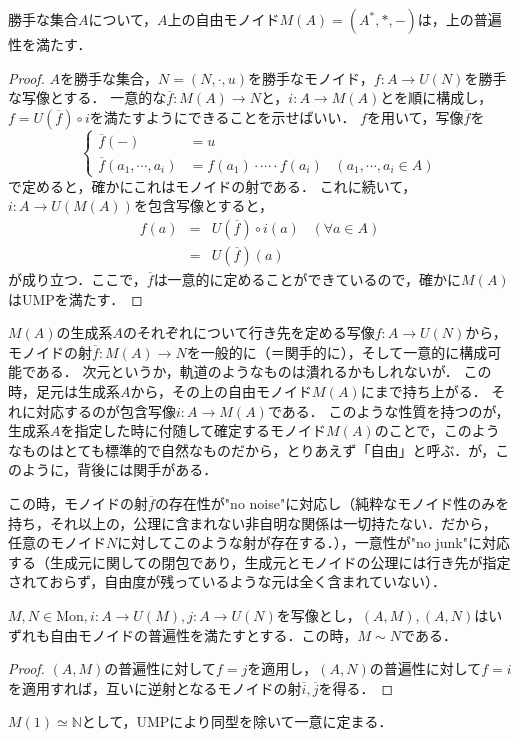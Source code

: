 \documentclass[uplatex, 12pt, dvipdfmx]{jsarticle}
\begin{document}
\begin{proposition}
    勝手な集合$A$について，$A$上の自由モノイド$M(A)=(A^*,*,-)$は，上の普遍性を満たす．
\end{proposition}
\begin{proof}
    $A$を勝手な集合，$N=(N,\cdot,u)$を勝手なモノイド，$f:A\to U(N)$を勝手な写像とする．
    一意的な$\overline{f}:M(A)\to N$と，$i:A\to M(A)$とを順に構成し，$f=U(\overline{f})\circ i$を満たすようにできることを示せばいい．
    $f$を用いて，写像$\overline{f}$を
    $$\begin{cases}
        \overline{f}(-) &= u \\
        \overline{f}(a_1,\cdots,a_i) &= f(a_1)\cdot\cdots\cdot f(a_i)\;\;\; (a_1,\cdots,a_i\in A)
    \end{cases}$$
    で定めると，確かにこれはモノイドの射である．
    これに続いて，$i:A\to U(M(A))$を包含写像とすると，
    \begin{eqnarray*}
        f(a)&=& U(\overline{f})\circ i(a)\;\;\; (\forall a\in A) \\
        &=& U(\overline{f})(a)
    \end{eqnarray*}
    が成り立つ．ここで，$\overline{f}$は一意的に定めることができているので，確かに$M(A)$はUMPを満たす．
\end{proof}
\begin{remark*}[自由モノイドの普遍性として妥当な直観的理由]
    $M(A)$の生成系$A$のそれぞれについて行き先を定める写像$f:A\to U(N)$から，モノイドの射$\overline{f}:M(A)\to N$を一般的に（＝関手的に），そして一意的に構成可能である．
    次元というか，軌道のようなものは潰れるかもしれないが．
    この時，足元は生成系$A$から，その上の自由モノイド$M(A)$にまで持ち上がる．
    それに対応するのが包含写像$i:A\to M(A)$である．
    このような性質を持つのが，生成系$A$を指定した時に付随して確定するモノイド$M(A)$のことで，このようなものはとても標準的で自然なものだから，とりあえず「自由」と呼ぶ．が，このように，背後には関手がある．

    この時，モノイドの射$\overline{f}$の存在性が"no noise"に対応し（純粋なモノイド性のみを持ち，それ以上の，公理に含まれない非自明な関係は一切持たない．だから，
    任意のモノイド$N$に対してこのような射が存在する．），一意性が"no junk"に対応する（生成元に関しての閉包であり，生成元とモノイドの公理には行き先が指定されておらず，自由度が残っているような元は全く含まれていない）．
\end{remark*}

\begin{proposition}[UMPが対象を同型を除いて一意に定める]
    $M,N\in\mathrm{Mon}, i:A\to U(M), j:A\to U(N)$を写像とし，$(A,M),(A,N)$はいずれも自由モノイドの普遍性を満たすとする．この時，$M\sim N$である．
\end{proposition}
\begin{proof}
    $(A,M)$の普遍性に対して$f=j$を適用し，$(A,N)$の普遍性に対して$f=i$を適用すれば，互いに逆射となるモノイドの射$\overline{i}, \overline{j}$を得る．
\end{proof}
\begin{example*}
    $M(1)\simeq\mathbb{N}$として，UMPにより同型を除いて一意に定まる．
\end{example*}
\end{document}
